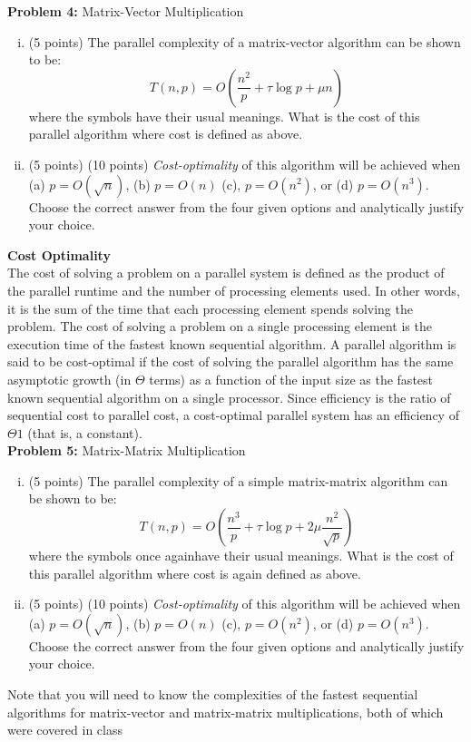 \documentclass{article}
\begin{document}
    \textbf{Problem 4:} Matrix-Vector Multiplication
    \begin{enumerate}[i.]
    \item (5 points) The parallel complexity of a matrix-vector algorithm can be shown to be:
    \begin{equation}
        T(n,p) = O(\frac{n^2}{p} + \tau\log{p}+\mu{n})
    \end{equation}
    where the symbols have their usual meanings. What is the cost of this parallel algorithm where cost is
defined as above.

    \item (5 points) (10 points) \textit{Cost-optimality} of this algorithm will be achieved when (a) $p = O(\sqrt{n})$, (b) $p = O(n)$ (c),
    $p = O(n^2)$, or (d) $p = O(n^3)$. Choose the correct answer from the four given options and analytically
    justify your choice.
    \end{enumerate}

    \textbf{Cost Optimality} \\
    The cost of solving a problem on a parallel system is defined as the product of the parallel runtime and
    the number of processing elements used. In other words, it is the sum of the time that each processing
    element spends solving the problem. The cost of solving a problem on a single processing element is the
    execution time of the fastest known sequential algorithm. A parallel algorithm is said to be cost-optimal
    if the cost of solving the parallel algorithm has the same asymptotic growth (in $\Theta$ terms) as a function of
    the input size as the fastest known sequential algorithm on a single processor. Since efficiency is the ratio
    of sequential cost to parallel cost, a cost-optimal parallel system has an efficiency of $\Theta$\(1\) (that is, a constant). \\


    \textbf{Problem 5:} Matrix-Matrix Multiplication
    \begin{enumerate}[i.]
    \item (5 points) The parallel complexity of a simple matrix-matrix algorithm can be shown to be:
    \begin{equation}
        T(n,p) = O(\frac{n^3}{p} + \tau\log{p}+2\mu\frac{n^2}{\sqrt{p}})
    \end{equation}
    where the symbols once againhave their usual meanings. What is the cost of this parallel algorithm
where cost is again defined as above.

    \item (5 points) (10 points) \textit{Cost-optimality} of this algorithm will be achieved when (a) $p = O(\sqrt{n})$, (b) $p = O(n)$ (c),
    $p = O(n^2)$, or (d) $p = O(n^3)$. Choose the correct answer from the four given options and analytically
    justify your choice.
    \end{enumerate}

Note that you will need to know the complexities of the fastest sequential algorithms for matrix-vector and
matrix-matrix multiplications, both of which were covered in class

    
\end{document}
